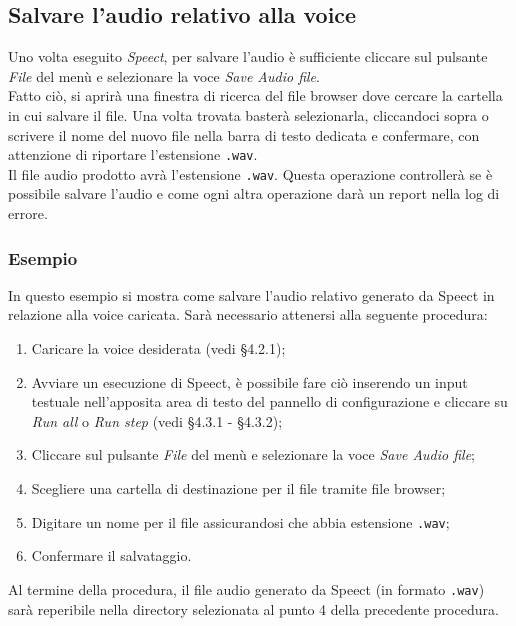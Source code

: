 \documentclass[openany,12pt,a4paper]{report}
\begin{document}
	\subsection{Salvare l'audio relativo alla voice}
	Uno volta eseguito \textit{Speect}, per salvare l'audio è sufficiente cliccare sul pulsante \textit{File} del menù e selezionare la voce \textit{Save Audio file}.\\
	Fatto ciò, si aprirà una finestra di ricerca del file browser dove cercare la cartella in cui salvare il file. Una volta trovata basterà selezionarla, cliccandoci sopra o scrivere il nome del nuovo file nella barra di testo dedicata e confermare, con attenzione di riportare l'estensione \verb|.wav|.\\
	Il file audio prodotto avrà l'estensione \verb|.wav|.
	Questa operazione controllerà se è possibile salvare l'audio e come ogni altra operazione darà un report nella log di errore.
	
	\subsubsection*{Esempio}
	
	In questo esempio si mostra come salvare l'audio relativo generato da Speect in relazione alla voice caricata. Sarà necessario attenersi alla seguente procedura:
	
	\begin{enumerate}
		\item Caricare la voice desiderata (vedi §4.2.1);
		\item Avviare un esecuzione di Speect, è possibile fare ciò inserendo un input testuale nell'apposita area di testo del pannello di configurazione e cliccare su \textit{Run all} o \textit{Run step} (vedi §4.3.1 - §4.3.2);
		\item Cliccare sul pulsante \textit{File} del menù e selezionare la voce \textit{Save Audio file}; 
		\item Scegliere una cartella di destinazione per il file tramite file browser;
		\item Digitare un nome per il file assicurandosi che abbia estensione \verb|.wav|;
		\item Confermare il salvataggio.
	\end{enumerate} 
	
	\noindent Al termine della procedura, il file audio generato da Speect (in formato \verb|.wav|) sarà reperibile nella directory selezionata al punto 4 della precedente procedura.
	
\end{document}
